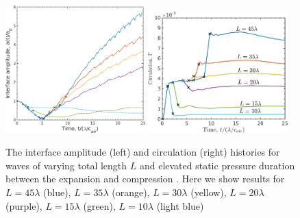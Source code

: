 \begin{figure}[h] 
  \centering
  \includegraphics[width=0.48\textwidth]{./figs/lung_figs/interface_multi-lag}
  \includegraphics[width=0.48\textwidth]{./figs/lung_figs/circulation_multi-lag_fixed}
  \caption[The interface and circulation dependence on wave
  duration]{The interface amplitude (left) and circulation (right)
    histories for waves of varying total length $L$ and elevated
    static pressure duration between the expansion and compression
    . Here we show results for $L=45\lambda$ (blue), $L=35\lambda$
    (orange), $L=30\lambda$ (yellow), $L=20\lambda$ (purple),
    $L=15\lambda$ (green), $L=10\lambda$ (light blue)}
  \label{fig:trapz_circ_interface_multi-lag}
\end{figure}

